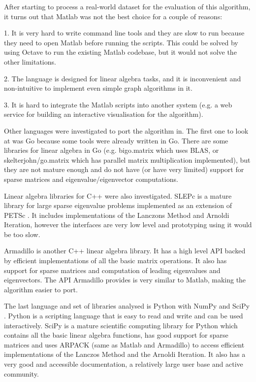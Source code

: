 \documentclass[12pt]{report}
\begin{document}
After starting to process a real-world dataset for the evaluation of this
algorithm, it turns out that Matlab was not the best choice for a couple of
reasons:

1. It is very hard to write command line tools and they are slow to run because
they need to open Matlab before running the scripts. This could be solved by
using Octave to run the existing Matlab codebase, but it would not solve the
other limitations.

2. The language is designed for linear algebra tasks, and it is inconvenient and
non-intuitive to implement even simple graph algorithms in it.

3. It is hard to integrate the Matlab scripts into another system (e.g. a
web service for building an interactive visualisation for the algorithm).


Other languages were investigated to port the algorithm in. The first one to
look at was Go because some tools were already written in Go. There are some
libraries for linear algebra in Go (e.g. bigo.matrix \cite{biogo} which uses
BLAS, or skelterjohn/go.matrix \cite{go.matrix} which has parallel matrix
multiplication implemented), but they are not mature enough and do not have
(or have very limited) support for sparse matrices and eigenvalue/eigenvector
computations.

Linear algebra libraries for C++ were also investigated. SLEPc \cite{slepc} is a
mature library for large sparse eigenvalue problems implemented as an extension
of PETSc \cite{petsc}. It includes implementations of the Lanczons Method and
Arnoldi Iteration, however the interfaces are very low level and prototyping
using it would be too slow.

Armadillo \cite{armadillo} is another C++ linear algebra library. It has a high
level API backed by efficient implementations of all the basic matrix operations.
It also has support for sparse matrices and computation of leading eigenvalues
and eigenvectors. The API Armadillo provides is very similar to Matlab, making
the algorithm easier to port.

The last language and set of libraries analysed is Python with NumPy and SciPy
\cite{scipy}. Python is a scripting language that is easy to read and write and
can be used interactively. SciPy is a mature scientific computing library for
Python which contains all the basic linear algebra functions, has good support
for sparse matrices and uses ARPACK (same as Matlab and Armadillo) to access
efficient implementations of the Lanczos Method and the Arnoldi Iteration. It
also has a very good and accessible documentation, a relatively large user base
and active community.
\end{document}
